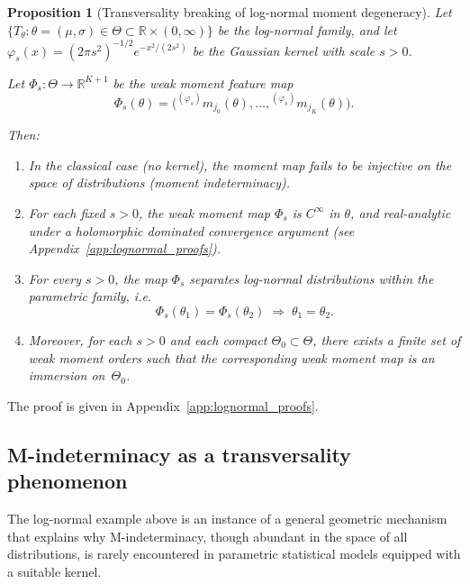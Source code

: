 \documentclass[11pt,a4paper]{article}
\newtheorem{proposition}[theorem]{Proposition}
\begin{document}
\begin{proposition}[Transversality breaking of log-normal moment degeneracy]
\label{prop:lognormal-transversality}
Let $\{T_\theta : \theta = (\mu,\sigma) \in \Theta \subset \mathbb R \times (0,\infty)\}$
be the log-normal family, and let $\varphi_s(x) = (2\pi s^2)^{-1/2} e^{-x^2/(2s^2)}$
be the Gaussian kernel with scale $s>0$.

Let $\Phi_s : \Theta \to \mathbb R^{K+1}$ be the weak moment feature map
\[
\Phi_s(\theta)
=
\big(
{}^{(\varphi_s)}m_{j_0}(\theta), \ldots,
{}^{(\varphi_s)}m_{j_K}(\theta)
\big).
\]

Then:

\begin{enumerate}
\item[(i)] In the classical case (no kernel), the moment map fails to be injective
on the space of distributions (moment indeterminacy).

\item[(ii)] For each fixed $s>0$, the weak moment map $\Phi_s$ is
$C^\infty$ in $\theta$, and real-analytic under a holomorphic
dominated convergence argument (see Appendix~\ref{app:lognormal_proofs}).

\item[(iii)] For every $s>0$, the map $\Phi_s$ separates
log-normal distributions within the parametric family, i.e.
\[
\Phi_s(\theta_1)=\Phi_s(\theta_2)
\;\Rightarrow\;
\theta_1=\theta_2.
\]

\item[(iv)] Moreover, for each $s>0$ and each compact
$\Theta_0\subset\Theta$, there exists a finite set of weak moment
orders such that the corresponding weak moment map is an immersion
on~$\Theta_0$.
\end{enumerate}
\end{proposition}

The proof is given in Appendix~\ref{app:lognormal_proofs}.

\subsection{M-indeterminacy as a transversality phenomenon}
\label{sec:M-determinacy-transversality}

The log-normal example above is an instance of a general geometric
mechanism that explains why M-indeterminacy, though abundant in the
space of all distributions, is rarely encountered in parametric
statistical models equipped with a suitable kernel.
\end{document}
